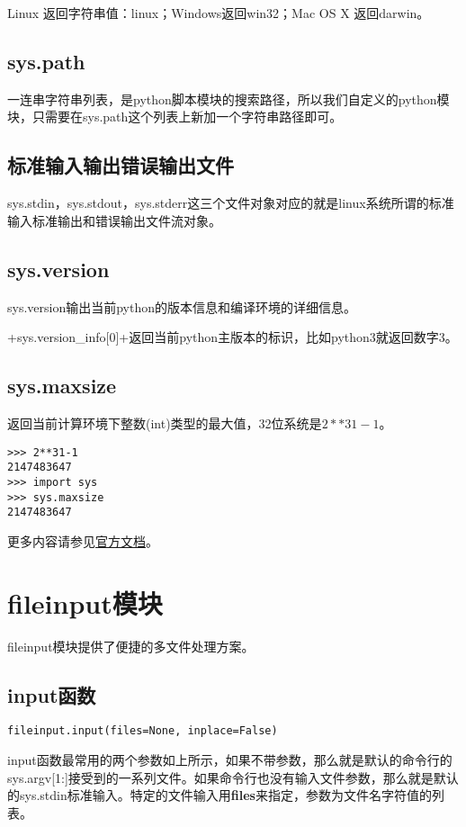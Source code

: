 \documentclass[12pt,oneside]{book}
\begin{document}
\begin{common-format}
Linux 返回字符串值：linux；Windows返回win32；Mac OS X 返回darwin。

\section{sys.path}
一连串字符串列表，是python脚本模块的搜索路径，所以我们自定义的python模块，只需要在sys.path这个列表上新加一个字符串路径即可。

\section{标准输入输出错误输出文件}
sys.stdin，sys.stdout，sys.stderr这三个文件对象对应的就是linux系统所谓的标准输入标准输出和错误输出文件流对象。

\section{sys.version}
sys.version输出当前python的版本信息和编译环境的详细信息。

+sys.version_info[0]+返回当前python主版本的标识，比如python3就返回数字3。

\section{sys.maxsize}
返回当前计算环境下整数(int)类型的最大值，32位系统是$2**31-1$。
\begin{Verbatim}
>>> 2**31-1
2147483647
>>> import sys
>>> sys.maxsize
2147483647
\end{Verbatim}




\begin{large}
更多内容请参见\href{https://docs.python.org/3/library/sys.html}{官方文档}。
\end{large}


\chapter{fileinput模块}
fileinput模块提供了便捷的多文件处理方案。

\section{input函数}
\begin{Verbatim}
fileinput.input(files=None, inplace=False)
\end{Verbatim}
input函数最常用的两个参数如上所示，如果不带参数，那么就是默认的命令行的sys.argv[1:]接受到的一系列文件。如果命令行也没有输入文件参数，那么就是默认的sys.stdin标准输入。特定的文件输入用\textbf{files}来指定，参数为文件名字符值的列表。


\end{common-format}
\end{document}

